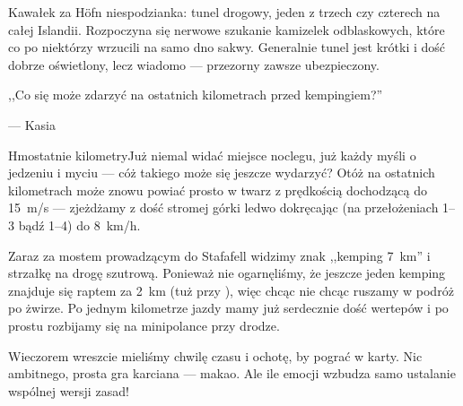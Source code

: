 
Kawałek za Höfn niespodzianka: tunel drogowy, jeden z trzech czy czterech na całej Islandii. Rozpoczyna się nerwowe szukanie kamizelek odblaskowych, które co po niektórzy wrzucili na samo dno sakwy. Generalnie tunel jest krótki i dość dobrze oświetlony, lecz wiadomo --- przezorny zawsze ubezpieczony.

\epigraph{,,Co się może zdarzyć na ostatnich kilometrach przed kempingiem?''}{--- \textup{Kasia}}

Hm\textellipsis ostatnie kilometry\textellipsis Już niemal widać miejsce noclegu, już każdy myśli o jedzeniu i myciu --- cóż takiego może się jeszcze wydarzyć? Otóż na ostatnich kilometrach może znowu powiać prosto w twarz z prędkością dochodzącą do 15~m/s --- zjeżdżamy z dość stromej górki ledwo dokręcając (na przełożeniach 1--3 bądź 1--4) do 8~km/h.

Zaraz za mostem prowadzącym do Stafafell widzimy znak ,,kemping 7~km'' i strzałkę na drogę szutrową. Ponieważ nie ogarnęliśmy, że jeszcze jeden kemping znajduje się raptem za 2~km (tuż przy ), więc chcąc nie chcąc ruszamy w podróż po żwirze. Po jednym kilometrze jazdy mamy już serdecznie dość wertepów i po prostu rozbijamy się na minipolance przy drodze.

Wieczorem wreszcie mieliśmy chwilę czasu i ochotę, by pograć w karty. Nic ambitnego, prosta gra karciana --- makao. Ale ile emocji wzbudza samo ustalanie wspólnej wersji zasad!

